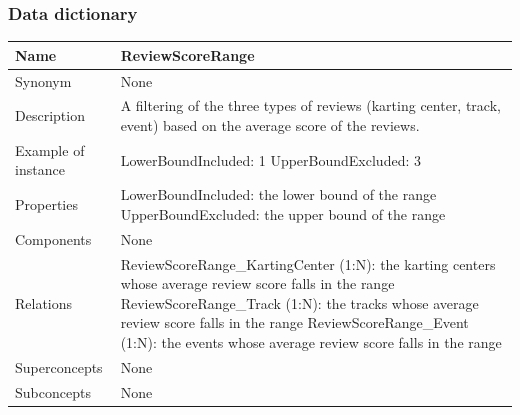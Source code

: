 \documentclass{beamer}
\begin{document}
\begin{frame}
    \frametitle{Data dictionary}
    \begin{table}
    \tiny
    \begin{tabular}{|p{2cm}|p{6cm}|}
    \hline
    Name & \textbf{ReviewScoreRange} \\
    \hline
    Synonym & None \\
    \hline
    Description & A filtering of the three types of reviews (karting center, track, event)
    based on the average score of the reviews. \\
    \hline
    Example of instance &
    LowerBoundIncluded: 1 \newline
    UpperBoundExcluded: 3 \\
    \hline
    Properties &
    LowerBoundIncluded: the lower bound of the range \newline
    UpperBoundExcluded: the upper bound of the range \\
    \hline
    Components & None \\
    \hline
    Relations &
    ReviewScoreRange\_KartingCenter (1:N): the karting centers whose average review score falls in the range \newline
    ReviewScoreRange\_Track (1:N): the tracks whose average review score falls in the range \newline
    ReviewScoreRange\_Event (1:N): the events whose average review score falls in the range \\
    \hline
    Superconcepts & None \\
    \hline
    Subconcepts & None \\
    \hline
    \end{tabular}
    \end{table}
\end{frame}
\end{document}
